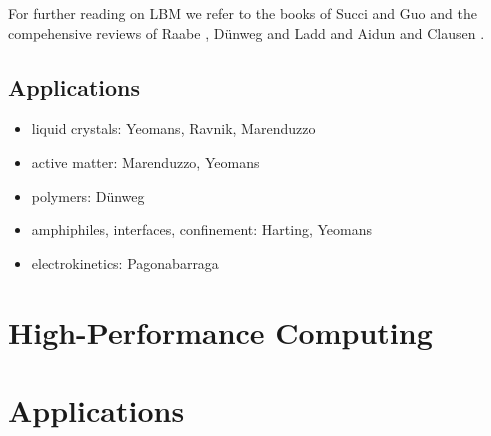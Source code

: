 \documentclass[8.5pt,twoside,twocolumn]{article}
\newcommand{\bit}{\begin{itemize}}
\newcommand{\eit}{\end{itemize}}
\begin{document}
For further reading on LBM we refer to the books of Succi \cite{Succi:2001} and Guo \cite{Guo:2013} and the 
compehensive reviews of Raabe \cite{Raabe:2004}, D\"unweg and Ladd \cite{Duenweg:2009} and Aidun and Clausen \cite{Aidun:2010}.

\subsection{Applications}

\bit
\item liquid crystals: Yeomans, Ravnik, Marenduzzo
\item active matter: Marenduzzo, Yeomans
\item polymers: D\"unweg
\item amphiphiles, interfaces, confinement: Harting, Yeomans 
\item electrokinetics: Pagonabarraga
\eit




\section{High-Performance Computing}


\section{Applications}
\end{document}
